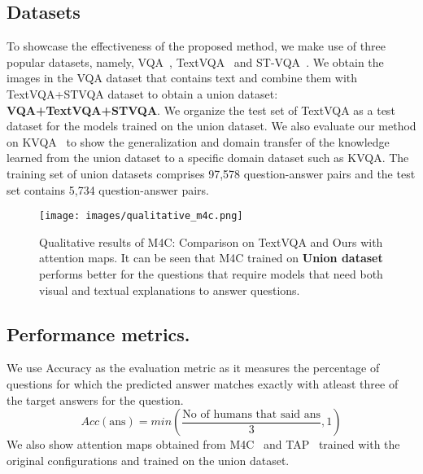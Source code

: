 \documentclass[10pt,twocolumn,letterpaper]{article}
\begin{document}
\subsection{Datasets}
\label{subsec:datasets}
To showcase the effectiveness of the proposed method, we make use of three popular datasets, namely, VQA~\cite{first-vqa:2017}, TextVQA~\cite{textVQA} and ST-VQA~\cite{stvqa}. We obtain the images in the VQA dataset that contains text and combine them with {TextVQA+STVQA} dataset to obtain a union dataset: \textbf{VQA+TextVQA+STVQA}. We organize the test set of TextVQA as a test dataset for the models trained on the union dataset. We also evaluate our method on KVQA~\cite{kvqa} to show the generalization and domain transfer of the knowledge learned from the union dataset to a specific domain dataset such as KVQA. The training set of union datasets comprises 97,578 question-answer pairs and the test set contains 5,734 question-answer pairs.


\begin{figure*}[!htb]
    \centering
    \texttt{[image: images/qualitative\_m4c.png]}
    \caption{Qualitative results of M4C: Comparison on TextVQA and Ours with attention maps. It can be seen that M4C trained on \textbf{Union dataset} performs better for the questions that require models that need both visual and textual explanations to answer questions.}
    \label{fig:qualitative_m4c}
\end{figure*}


\noindent
\subsection{Performance metrics.}
We use Accuracy as the evaluation metric as it measures the percentage of questions for which the predicted answer matches exactly with atleast three of the target answers for the question. 
\begin{equation}
    Acc(\text{ans}) = min\left(\frac{\text{No of humans that said ans}}{3},1\right)
\end{equation}
We also show attention maps obtained from M4C~\cite{M4C:2020} and TAP~\cite{TAP} trained with the original configurations and trained on the union dataset.

\noindent
\end{document}
